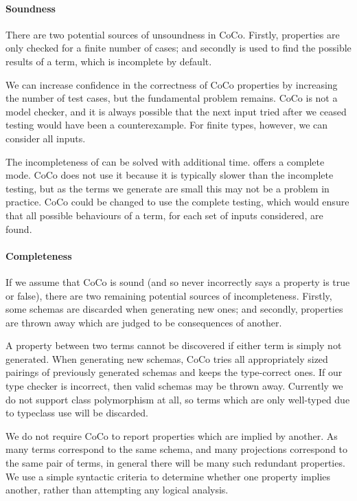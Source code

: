 \paragraph{Soundness}
There are two potential sources of unsoundness in CoCo.  Firstly,
properties are only checked for a finite number of cases; and secondly
\dejafu{} is used to find the possible results of a term, which is
incomplete by default.

We can increase confidence in the correctness of CoCo properties by
increasing the number of test cases, but the fundamental problem
remains.  CoCo is not a model checker, and it is always possible that
the next input tried after we ceased testing would have been a
counterexample.  For finite types, however, we can consider all
inputs.

The incompleteness of \dejafu{} can be solved with additional time.
\dejafu{} offers a complete mode.  CoCo does not use it because it is
typically slower than the incomplete testing, but as the terms we
generate are small this may not be a problem in practice.  CoCo could
be changed to use the complete testing, which would ensure that all
possible behaviours of a term, for each set of inputs considered, are
found.

\paragraph{Completeness}
If we assume that CoCo is sound (and so never incorrectly says a
property is true or false), there are two remaining potential sources
of incompleteness.  Firstly, some schemas are discarded when
generating new ones; and secondly, properties are thrown away which
are judged to be consequences of another.

A property between two terms cannot be discovered if either term is
simply not generated.  When generating new schemas, CoCo tries all
appropriately sized pairings of previously generated schemas and keeps
the type-correct ones.  If our type checker is incorrect, then valid
schemas may be thrown away.  Currently we do not support class
polymorphism at all, so terms which are only well-typed due to
typeclass use will be discarded.

We do not require CoCo to report properties which are implied by
another.  As many terms correspond to the same schema, and many
projections correspond to the same pair of terms, in general there
will be many such redundant properties.  We use a simple syntactic
criteria to determine whether one property implies another, rather
than attempting any logical analysis.

